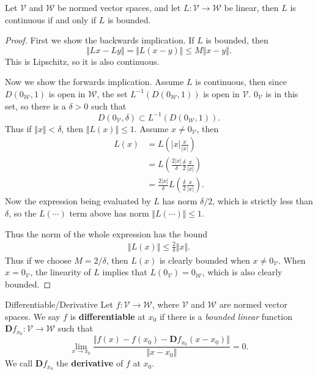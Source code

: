 \documentclass[10pt]{report}
\begin{document}
\begin{prop}
	Let $\mathcal{V}$ and $\mathcal{W}$ be normed vector spaces, and let $L:\mathcal{V}\to\mathcal{W}$ be linear, then $L$ is continuous if and only if $L$ is bounded.
\end{prop}
\begin{proof}
	First we show the backwards implication. If $L$ is bounded, then \[\Vert{Lx-Ly}\Vert= \Vert{L(x-y)}\Vert\leq M \Vert{x-y}\Vert.\] This is Lipschitz, so it is also continuous.

	Now we show the forwards implication. Assume $L$ is continuous, then since $D(0_\mathcal{W}, 1)$ is open in $\mathcal{W}$, the set $L^{-1}(D(0_\mathcal{W}, 1))$ is open in $\mathcal{V}$. $0_\mathcal{V}$ is in this set, so there is a $\delta>0$ such that
	 \[
		 D(0_\mathcal{V}, \delta) \subset L^{-1}(D(0_\mathcal{W},1)).
	 \] Thus if $\Vert{x}\Vert<\delta$, then $\Vert{L(x)}\Vert \leq 1$. Assume $x\neq 0_\mathcal{V}$, then
	\begin{align*}
		L(x) &= L\left( |x| \frac{x}{|x|}  \right) \\
		     &= L\left( \frac{2|x|}{\delta} \frac{\delta}{2} \frac{x}{|x|}  \right) \\
		     &= \frac{2 |x|}{\delta} L\left(\frac{\delta}{2} \frac{x}{|x|}\right).
	\end{align*}
	Now the expression being evaluated by $L$ has norm $\delta/2$, which is strictly less than $\delta$, so the $L(\cdots)$ term above has norm $\Vert{L(\cdots)}\Vert\leq 1$.

	Thus the norm of the whole expression has the bound
	\begin{align*}
		\Vert{L(x)}\Vert \leq \frac{2}{\delta} \Vert{x}\Vert.
	\end{align*}
	Thus if we choose $M = 2/\delta$, then $L(x)$ is clearly bounded when $x \neq 0_\mathcal{V}$. When $x=0_\mathcal{V}$, the linearity of $ L$ implies that $L(0_\mathcal{V}) = 0_\mathcal{W}$, which is also clearly bounded.
\end{proof}

\begin{defn}{Differentiable/Derivative}{}
	Let $f: \mathcal{V} \to \mathcal{W}$, where $\mathcal{V}$ and $\mathcal{W}$ are normed vector spaces. We say $f$ is \textbf{differentiable} at $x_0$ if there is a \textit{bounded linear} function $\mathbf{D}f_{x_0}: \mathcal{V} \to \mathcal{W}$ such that
	\[
		\lim_{x \to x_0} \frac{\Vert{f(x) - f(x_0) - \mathbf{D}f_{x_0}(x-x_0)}\Vert}{\Vert{x-x_0}\Vert} =0.
	\] We call $\mathbf{D}f_{x_0}$ the \textbf{derivative} of $f$ at $x_0$.
\end{defn}
\end{document}

